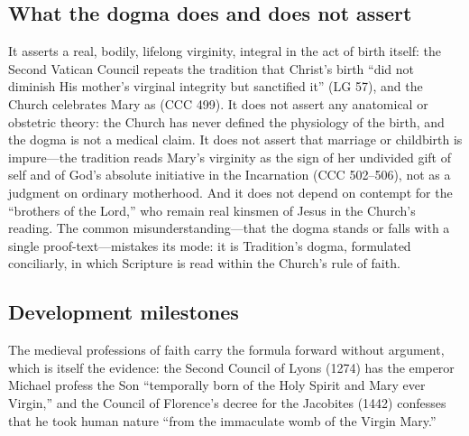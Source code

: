 \subsection*{What the dogma does and does not assert}

It asserts a real, bodily, lifelong virginity, integral in the act of
birth itself: the Second Vatican Council repeats the tradition that
Christ's birth ``did not diminish His mother's virginal integrity but
sanctified it'' (LG 57), and the Church celebrates Mary as
 (CCC 499). It does not assert any anatomical or
obstetric theory: the Church has never defined the physiology of the
birth, and the dogma is not a medical claim. It does not assert that
marriage or childbirth is impure---the tradition reads Mary's virginity
as the sign of her undivided gift of self and of God's absolute
initiative in the Incarnation (CCC 502--506), not as a judgment on
ordinary motherhood. And it does not depend on contempt for the
``brothers of the Lord,'' who remain real kinsmen of Jesus in the
Church's reading. The common misunderstanding---that the dogma stands or
falls with a single proof-text---mistakes its mode: it is Tradition's
dogma, formulated conciliarly, in which Scripture is read within the
Church's rule of faith.

\subsection*{Development milestones}

The medieval professions of faith carry the formula forward without
argument, which is itself the evidence: the Second Council of Lyons
(1274) has the emperor Michael profess the Son ``temporally born of the
Holy Spirit and Mary ever Virgin,'' and the Council of Florence's decree
for the Jacobites (1442) confesses that he took human nature ``from the
immaculate womb of the Virgin Mary.''

